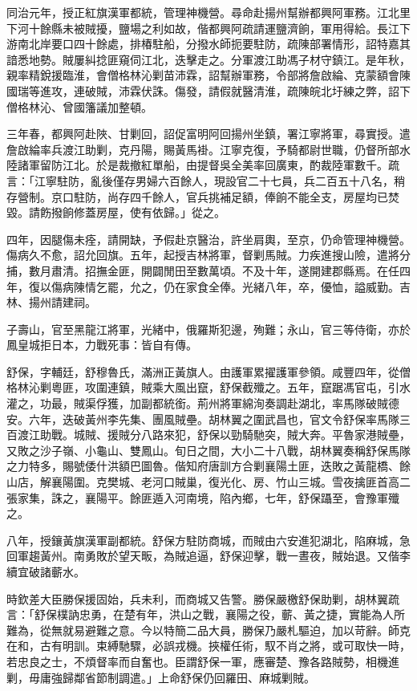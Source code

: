 \begin{pinyinscope}
同治元年，授正紅旗漢軍都統，管理神機營。尋命赴揚州幫辦都興阿軍務。江北里下河十餘縣未被賊擾，鹽場之利如故，偕都興阿疏請運鹽濟餉，軍用得給。長江下游南北岸要口四十餘處，排椿駐船，分撥水師扼要駐防，疏陳部署情形，詔特嘉其諳悉地勢。賊屢糾捻匪窺伺江北，迭擊走之。分軍渡江助馮子材守鎮江。是年秋，親率精銳援臨淮，會僧格林沁剿苗沛霖，詔幫辦軍務，令部將詹啟綸、克蒙額會陳國瑞等進攻，連破賊，沛霖伏誅。傷發，請假就醫清淮，疏陳皖北圩練之弊，詔下僧格林沁、曾國籓議加整頓。

三年春，都興阿赴陜、甘剿回，詔促富明阿回揚州坐鎮，署江寧將軍，尋實授。遣詹啟綸率兵渡江助剿，克丹陽，賜黃馬褂。江寧克復，予騎都尉世職，仍督所部水陸諸軍留防江北。於是裁撤紅單船，由提督吳全美率回廣東，酌裁陸軍數千。疏言：「江寧駐防，亂後僅存男婦六百餘人，現設官二十七員，兵二百五十八名，稍存營制。京口駐防，尚存四千餘人，官兵挑補足額，俸餉不能全支，房屋均已焚毀。請飭撥餉修蓋房屋，使有依歸。」從之。

四年，因腿傷未痊，請開缺，予假赴京醫治，許坐肩輿，至京，仍命管理神機營。傷病久不愈，詔允回旗。五年，起授吉林將軍，督剿馬賊。力疾進搜山險，遣將分捕，數月肅清。招撫金匪，開闢閒田至數萬頃。不及十年，遂開建郡縣焉。在任四年，復以傷病陳情乞罷，允之，仍在家食全俸。光緒八年，卒，優恤，謚威勤。吉林、揚州請建祠。

子壽山，官至黑龍江將軍，光緒中，俄羅斯犯邊，殉難；永山，官三等侍衛，亦於鳳皇城拒日本，力戰死事：皆自有傳。

舒保，字輔廷，舒穆魯氏，滿洲正黃旗人。由護軍累擢護軍參領。咸豐四年，從僧格林沁剿粵匪，攻圍連鎮，賊乘大風出竄，舒保截殲之。五年，竄踞馮官屯，引水灌之，功最，賊渠俘獲，加副都統銜。荊州將軍綿洵奏調赴湖北，率馬隊破賊德安。六年，迭破黃州李先集、團風賊壘。胡林翼之圍武昌也，官文令舒保率馬隊三百渡江助戰。城賊、援賊分八路來犯，舒保以勁騎馳突，賊大奔。平魯家港賊壘，又敗之沙子嶺、小龜山、雙鳳山。旬日之間，大小二十八戰，胡林翼奏稱舒保馬隊之力特多，賜號倭什洪額巴圖魯。偕知府唐訓方合剿襄陽土匪，迭敗之黃龍橋、餘山店，解襄陽圍。克樊城、老河口賊巢，復光化、房、竹山三城。雪夜擒匪首高二張家集，誅之，襄陽平。餘匪遁入河南境，陷內鄉，七年，舒保躡至，會豫軍殲之。

八年，授鑲黃旗漢軍副都統。舒保方駐防商城，而賊由六安進犯湖北，陷麻城，急回軍趨黃州。南勇敗於望天畈，為賊追逼，舒保迎擊，戰一晝夜，賊始退。又偕李續宜破諸蘄水。

時欽差大臣勝保援固始，兵未利，而商城又告警。勝保嚴檄舒保助剿，胡林翼疏言：「舒保樸訥忠勇，在楚有年，洪山之戰，襄陽之役，蘄、黃之捷，實能為人所難為，從無就易避難之意。今以特簡二品大員，勝保乃嚴札驅迫，加以苛辭。師克在和，古有明訓。束縛馳驟，必誤戎機。挾權任術，馭不肖之將，或可取快一時，若忠良之士，不煩督率而自奮也。臣謂舒保一軍，應審楚、豫各路賊勢，相機進剿，毋庸強歸鄰省節制調遣。」上命舒保仍回羅田、麻城剿賊。


\end{pinyinscope}
